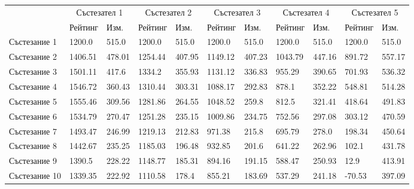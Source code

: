 \documentclass[a4paper,12pt]{article}
\begin{document}
  {\tiny
    \begin{center}
      \begin{tabular}{ | l | l | l | l | l | l | l | l | l | l | l |}
        \hline
         & \multicolumn{2}{|c|}{Състезател 1} & \multicolumn{2}{|c|}{Състезател 2} & \multicolumn{2}{|c|}{Състезател 3} & \multicolumn{2}{|c|}{Състезател 4} & \multicolumn{2}{|c|}{Състезател 5} \\
         & Рейтинг & Изм. & Рейтинг & Изм. & Рейтинг & Изм. & Рейтинг & Изм. & Рейтинг & Изм. \\
        \hline
        Състезание 1 & 1200.0 & 515.0 & 1200.0 & 515.0 & 1200.0 & 515.0 & 1200.0 & 515.0 & 1200.0 & 515.0 \\
        Състезание 2 & 1406.51 & 478.01 & 1254.44 & 407.95 & 1149.12 & 407.23 & 1043.79 & 447.16 & 891.72 & 557.17 \\
        Състезание 3 & 1501.11 & 417.6 & 1334.2 & 355.93 & 1131.12 & 336.83 & 955.29 & 390.65 & 701.93 & 536.32 \\
        Състезание 4 & 1546.72 & 360.43 & 1310.44 & 303.31 & 1088.17 & 292.83 & 878.1 & 352.22 & 548.81 & 514.28 \\
        Състезание 5 & 1555.46 & 309.56 & 1281.86 & 264.55 & 1048.52 & 259.8 & 812.5 & 321.41 & 418.64 & 491.83 \\
        Състезание 6 & 1534.79 & 270.47 & 1251.28 & 235.15 & 1009.86 & 234.75 & 752.56 & 297.08 & 303.12 & 470.59 \\
        Състезание 7 & 1493.47 & 246.99 & 1219.13 & 212.83 & 971.38 & 215.8 & 695.79 & 278.0 & 198.34 & 450.64 \\
        Състезание 8 & 1442.67 & 235.25 & 1185.03 & 196.48 & 932.85 & 201.6 & 641.22 & 262.96 & 102.1 & 431.78 \\
        Състезание 9 & 1390.5 & 228.22 & 1148.77 & 185.31 & 894.16 & 191.15 & 588.47 & 250.93 & 12.9 & 413.91 \\
        Състезание 10 & 1339.35 & 222.92 & 1110.58 & 178.4 & 855.21 & 183.69 & 537.29 & 241.18 & -70.53 & 397.09 \\
        \hline
      \end{tabular}
    \end{center}
  }
  
\end{document}

